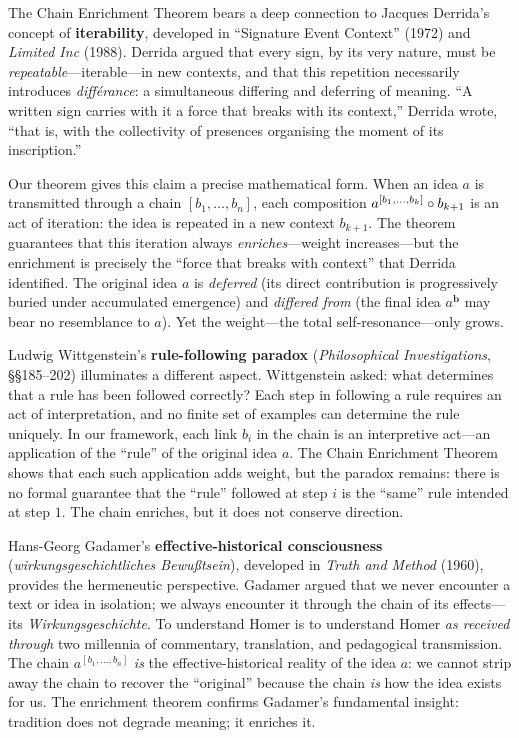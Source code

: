 \begin{interpretation}
\label{interp:ch8:derrida_iterability}
The Chain Enrichment Theorem bears a deep connection to Jacques Derrida's
concept of \textbf{iterability}, developed in ``Signature Event Context''
(1972) and \emph{Limited Inc} (1988).  Derrida argued that every sign, by
its very nature, must be \emph{repeatable}---iterable---in new contexts, and
that this repetition necessarily introduces \emph{diff\'erance}: a
simultaneous differing and deferring of meaning.  ``A written sign carries
with it a force that breaks with its context,'' Derrida wrote, ``that is,
with the collectivity of presences organising the moment of its inscription.''

Our theorem gives this claim a precise mathematical form.  When an idea $a$
is transmitted through a chain $[b_1, \ldots, b_n]$, each composition
$a^{[b_1,\ldots,b_k]} \circ b_{k+1}$ is an act of iteration: the idea is
repeated in a new context $b_{k+1}$.  The theorem guarantees that this
iteration always \emph{enriches}---weight increases---but the enrichment is
precisely the ``force that breaks with context'' that Derrida identified.
The original idea $a$ is \emph{deferred} (its direct contribution is
progressively buried under accumulated emergence) and \emph{differed from}
(the final idea $a^{\mathbf{b}}$ may bear no resemblance to $a$).  Yet the
weight---the total self-resonance---only grows.

Ludwig Wittgenstein's \textbf{rule-following paradox} (\emph{Philosophical
Investigations}, \S\S185--202) illuminates a different aspect.
Wittgenstein asked: what determines that a rule has been followed correctly?
Each step in following a rule requires an act of interpretation, and no finite
set of examples can determine the rule uniquely.  In our framework, each link
$b_i$ in the chain is an interpretive act---an application of the ``rule'' of
the original idea $a$.  The Chain Enrichment Theorem shows that each such
application adds weight, but the paradox remains: there is no formal
guarantee that the ``rule'' followed at step $i$ is the ``same'' rule
intended at step $1$.  The chain enriches, but it does not conserve direction.

Hans-Georg Gadamer's \textbf{effective-historical consciousness}
(\emph{wirkungsgeschichtliches Bewu\ss{}tsein}), developed in \emph{Truth
and Method} (1960), provides the hermeneutic perspective.  Gadamer argued
that we never encounter a text or idea in isolation; we always encounter it
through the chain of its effects---its \emph{Wirkungsgeschichte}.  To
understand Homer is to understand Homer \emph{as received through} two
millennia of commentary, translation, and pedagogical transmission.  The
chain $a^{[b_1,\ldots,b_n]}$ \emph{is} the effective-historical reality of
the idea $a$: we cannot strip away the chain to recover the ``original''
because the chain \emph{is} how the idea exists for us.  The enrichment
theorem confirms Gadamer's fundamental insight: tradition does not degrade
meaning; it enriches it.
\end{interpretation}



